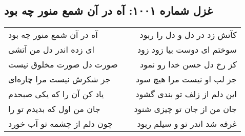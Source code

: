 \begin{center}
\section*{غزل شماره ۱۰۰۱: آه در آن شمع منور چه بود}
\label{sec:1001}
\begin{longtable}{l p{0.5cm} r}
آه در آن شمع منور چه بود
&&
کآتش زد در دل و دل را ربود
\\
ای زده اندر دل من آتشی
&&
سوختم ای دوست بیا زود زود
\\
صورت دل صورت مخلوق نیست
&&
کز رخ دل حسن خدا رو نمود
\\
جز شکرش نیست مرا چاره‌ای
&&
جز لب او نیست مرا هیچ سود
\\
یاد کن آن را که یکی صبحدم
&&
این دلم از زلف تو بندی گشود
\\
جان من اول که بدیدم تو را
&&
جان من از جان تو چیزی شنود
\\
چون دلم از چشمه تو آب خورد
&&
غرقه شد اندر تو و سیلم ربود
\\
\end{longtable}
\end{center}
